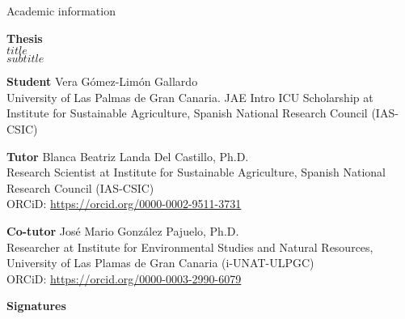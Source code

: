 \begin{flushleft}
  \Large
    Academic information
        
  \vspace{0.5cm}
  \normalsize
  \textbf{Thesis}\\
  \textit{$title$\\$subtitle$}
  
  \vspace{0.5cm}
  \textbf{Student}
    Vera Gómez-Limón Gallardo\\
    University of Las Palmas de Gran Canaria. JAE Intro ICU Scholarship at Institute for Sustainable Agriculture, Spanish National Research Council (IAS-CSIC)
  
  \vspace{0.5cm}
  \textbf{Tutor}
    Blanca Beatriz Landa Del Castillo, Ph.D.\\
    Research Scientist at Institute for Sustainable Agriculture, Spanish National Research Council (IAS-CSIC)\\
    ORCiD: \url{https://orcid.org/0000-0002-9511-3731}
  
  \vspace{0.5cm}
  \textbf{Co-tutor}
    José Mario González Pajuelo, Ph.D.\\
    Researcher at Institute for Environmental Studies and Natural Resources, University of Las Plamas de Gran Canaria (i-UNAT-ULPGC)\\
    ORCiD: \url{https://orcid.org/0000-0003-2990-6079}
  
  \vspace{0.5cm}
  \centerline{\textbf{Signatures}}
\end{flushleft}
